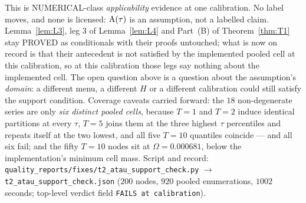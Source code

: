 \begin{remark}
\begin{itemize}[leftmargin=1.6em,itemsep=3pt]
\end{itemize}
This is NUMERICAL-class \emph{applicability} evidence at one calibration. No label moves,
and none is licensed: $\mathrm{A}(\tau)$ is an assumption, not a labelled claim. Lemma~\ref{lem:L3}, leg 3 of
Lemma~\ref{lem:L4} and Part~(B) of Theorem~\ref{thm:T1} stay PROVED as conditionals with
their proofs untouched; what is now on record is that their antecedent is not satisfied by the
implemented pooled cell at this calibration, so at this calibration those legs say nothing about the
implemented cell. The open question above is a question about the assumption's \emph{domain}: a
different menu, a different $H$ or a different calibration could still satisfy the support condition.
Coverage caveats carried forward: the $18$ non-degenerate series are only \emph{six distinct pooled
cells}, because $T = 1$ and $T = 2$ induce identical partitions at every $\tau$, $T = 5$ joins them
at the three highest $\tau$ percentiles and repeats itself at the two lowest, and all five $T = 10$
quantiles coincide --- and all six fail; and the fifty $T = 10$ nodes sit at $\Omega = 0.000681$,
below the implementation's minimum cell mass. Script and record:
\texttt{quality\_reports/fixes/t2\_atau\_support\_check.py} $\to$
\texttt{t2\_atau\_support\_check.json} ($200$ nodes, $920$ pooled enumerations, $1002$ seconds;
top-level verdict field \texttt{FAILS at calibration}).
\end{remark}

